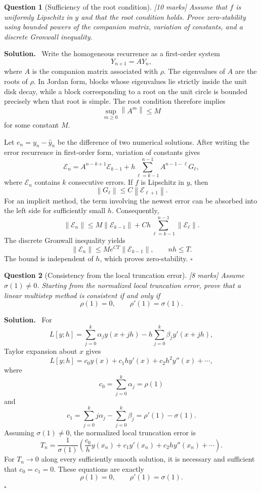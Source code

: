 \documentclass[11pt,a4paper]{article}
\theoremstyle{questionstyle}
\newtheorem{question}{Question}
\newenvironment{solution}
  {\par\noindent\textbf{\color{solutiongreen}Solution.}\ }
  {\hfill$\square$\par}
\newcommand{\pointmark}[1]{\hfill\textnormal{\textit{[#1 marks]}}}
\newcommand{\norm}[1]{\left\lVert#1\right\rVert}
\begin{document}
\begin{question}[Sufficiency of the root condition]\pointmark{10}
Assume that \(f\) is uniformly Lipschitz in \(y\) and that the root
condition holds.  Prove zero-stability using bounded powers of the
companion matrix, variation of constants, and a discrete Gronwall
inequality.
\end{question}

\begin{solution}
Write the homogeneous recurrence as a first-order system
\[
  Y_{n+1}=AY_n,
\]
where \(A\) is the companion matrix associated with \(\rho\).  The
eigenvalues of \(A\) are the roots of \(\rho\).  In Jordan form, blocks
whose eigenvalues lie strictly inside the unit disk decay, while a
block corresponding to a root on the unit circle is bounded precisely
when that root is simple.  The root condition therefore implies
\[
  \sup_{m\geq0}\norm{A^m}\leq M
\]
for some constant \(M\).

Let \(e_n=y_n-\widehat y_n\) be the difference of two numerical
solutions.  After writing the error recurrence in first-order form,
variation of constants gives
\[
  \mathcal E_n
  =A^{n-k+1}\mathcal E_{k-1}
   +h\sum_{\ell=k-1}^{n-1}
      A^{n-1-\ell}G_\ell ,
\]
where \(\mathcal E_n\) contains \(k\) consecutive errors.  If \(f\) is
Lipschitz in \(y\), then
\[
  \norm{G_\ell}\leq C\norm{\mathcal E_{\ell+1}}.
\]
For an implicit method, the term involving the newest error can be
absorbed into the left side for sufficiently small \(h\).  Consequently,
\[
  \norm{\mathcal E_n}
  \leq M\norm{\mathcal E_{k-1}}
    +Ch\sum_{\ell=k-1}^{n-1}\norm{\mathcal E_\ell}.
\]
The discrete Gronwall inequality yields
\[
  \norm{\mathcal E_n}
  \leq M e^{CT}\norm{\mathcal E_{k-1}},
  \qquad nh\leq T.
\]
The bound is independent of \(h\), which proves zero-stability.
\end{solution}

\begin{question}[Consistency from the local truncation error]\pointmark{8}
Assume \(\sigma(1)\neq0\).  Starting from the normalized local
truncation error, prove that a linear multistep method is consistent
if and only if
\[
  \rho(1)=0,\qquad \rho'(1)=\sigma(1).
\]
\end{question}

\begin{solution}
For
\[
  L[y;h]=\sum_{j=0}^{k}\alpha_jy(x+jh)
  -h\sum_{j=0}^{k}\beta_jy'(x+jh),
\]
Taylor expansion about \(x\) gives
\[
  L[y;h]=c_0y(x)+c_1hy'(x)+c_2h^2y''(x)+\cdots,
\]
where
\[
  c_0=\sum_{j=0}^{k}\alpha_j=\rho(1)
\]
and
\[
  c_1=\sum_{j=0}^{k}j\alpha_j-\sum_{j=0}^{k}\beta_j
      =\rho'(1)-\sigma(1).
\]
Assuming \(\sigma(1)\neq0\), the normalized local truncation error is
\[
  T_n=\frac1{\sigma(1)}
  \left(\frac{c_0}{h}y(x_n)+c_1y'(x_n)
  +c_2hy''(x_n)+\cdots\right).
\]
For \(T_n\to0\) along every sufficiently smooth solution, it is
necessary and sufficient that \(c_0=c_1=0\).  These equations are
exactly
\[
  \rho(1)=0,\qquad \rho'(1)=\sigma(1).
\]
\end{solution}
\end{document}
